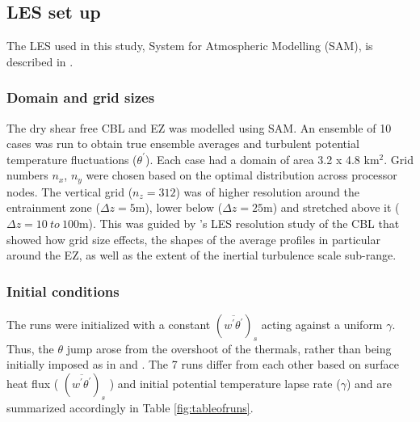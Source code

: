 \subsection{LES set up}

The LES used in this study, System for Atmospheric Modelling (SAM), is described in \cite{KhairRand}.

\subsubsection{Domain and grid sizes}
The dry shear free CBL and EZ was modelled using SAM.  An ensemble of 10 cases was run to obtain true ensemble averages and turbulent potential temperature fluctuations ($\theta^{'}$). Each case had a domain of area 3.2 x 4.8 km$^{2}$.  Grid numbers $n_{x}$, $n_{y}$ were chosen based on the optimal distribution across processor nodes. The vertical grid ($n_{z}=312$) was of higher resolution around the entrainment zone ($\Delta z = 5$m), lower below ($\Delta z = 25$m) and stretched above it ($\Delta z = 10 \ to \ 100 $m). This was guided by \cite{SullPat}'s LES resolution study of the CBL that showed how grid size effects, the shapes of the average profiles in particular around the EZ, as well as the extent of the inertial turbulence scale sub-range.\\

\subsubsection{Initial conditions}

The runs were initialized with a constant $(\overline{w^{'}\theta^{'}})_{s}$ acting against a uniform $\gamma$.  Thus, the  $\theta$ jump arose from the overshoot of the thermals, rather than being initially imposed as in \cite{SullMoengStev} and \cite{BrooksFowler2}.  The 7 runs differ from each other based on surface heat flux ( $(\overline{w^{'}\theta^{'}})_{s}$ ) and initial potential temperature lapse rate ($\gamma$) and are summarized accordingly in Table \ref{fig:tableofruns}.

